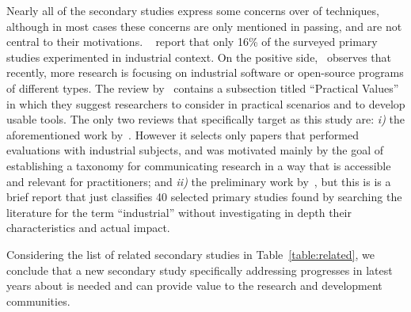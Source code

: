 \vspace{0,2cm}
Nearly all of the secondary studies express some concerns over \rea of \rt techniques, although in most cases these concerns are only mentioned in passing, and are not central to their motivations.
~\citet{rosero_15_2016} report that only 16\% of the surveyed primary studies experimented in industrial context.
On the positive side,~\citet{do_recent_2016} observes that recently, more research is focusing on industrial software or open-source programs of different types.
The review by~\citet{lou_survey_2018} contains a subsection titled ``Practical Values'' in which they suggest researchers to consider \tcp in practical scenarios and to develop usable \tcp tools.
The only two reviews that specifically target \rea as this study are: \textit{i)} the aforementioned work by~\citet{bin_ali_search_2019}. However it selects only papers that performed evaluations with industrial subjects, and was motivated mainly by the goal of establishing a taxonomy for communicating \rt research in a way that is accessible and relevant for practitioners; 
and \textit{ii)} the preliminary work by~\citet{rosero2021software}, but this is is a brief report that just classifies 40 selected primary studies found by searching the \tcp literature for the term ``industrial'' without investigating in depth their characteristics and actual impact.


Considering the list of related secondary studies in Table~\ref{table:related}, we conclude that a new secondary study specifically addressing progresses in latest years about \rea is needed and can provide value to the research and development communities.

